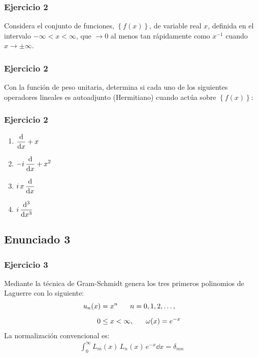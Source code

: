 \documentclass[12pt]{beamer}
\begin{document}
\begin{frame}
\frametitle{Ejercicio 2}
Considera el conjunto de funciones, $\left\{ f (x) \right\}$, de variable real $x$, definida en el intervalo $-\infty < x < \infty$, que $\to 0$ al menos tan rápidamente como $x^{-1}$ cuando $x \to \pm \infty$.
\end{frame}
\begin{frame}
\frametitle{Ejercicio 2}
Con la función de peso unitaria, determina si cada uno de los siguientes operadores lineales es autoadjunto (Hermitiano) cuando actúa sobre $\left\{ f (x) \right\}$:
\end{frame}
\begin{frame}
\frametitle{Ejercicio 2}
\begin{enumerate}[<+->]
\item $\displaystyle \dv{x} + x$
\item $\displaystyle - i \, \dv{x} + x^{2}$
\item $\displaystyle i \, x \, \dv{x}$
\item $\displaystyle i \, \dv[3]{x}$
\end{enumerate}
\end{frame}

\subsection{Enunciado 3}

\begin{frame}
\frametitle{Ejercicio 3}
Mediante la técnica de Gram-Schmidt genera los tres primeros polinomios de Laguerre con lo siguiente:
\begin{align*}
u_{n}(x) &= x^{n} \hspace{0.6cm} n = 0, 1, 2, \ldots, \\[0.5em]
0 &\leq x < \infty, \hspace{0.6cm} \omega(x) = e^{-x}
\end{align*}
La normalización convencional es:
\begin{align*}
\int_{0}^{\infty} L_{m}(x) \, L_{n}(x) \, e^{-x} \dd{x} = \delta_{mn}
\end{align*}
\end{frame}
\end{document}

